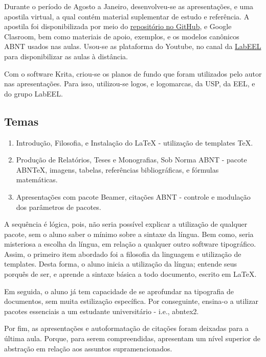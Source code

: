 \documentclass[
12pt,				%
openright,			%
oneside,			%
a4paper,			%
english,			%
french,				%
spanish,			%
brazil,				%
]{abntex2}
\begin{document}
Durante o período de Agosto a Janeiro, desenvolveu-se as apresentações, e
uma apostila virtual, a qual contém material suplementar de estudo e
referência. A apostila foi disponibilizada por meio do
\href{https://github.com/26-55-87-BuddhiLW/MC-LaTeX}{repositório no
  GitHub}, e Google Clasroom, bem como materiais de apoio,
exemplos, e os modelos canônicos ABNT usados nas aulas.  Usou-se as
plataforma do Youtube, no canal da
\href{https://www.youtube.com/channel/UC9kL6UL-iEq4nJKGs1nezQQ}{LabEEL}
para disponibilizar as aulas à distância.

Com o software Krita, criou-se os planos de fundo que foram utilizados
pelo autor nas apresentações. Para isso, utilizou-se logos, e
logomarcas, da USP, da EEL, e do grupo LabEEL.


\subsection{Temas}

\begin{enumerate}
\item Introdução, Filosofia, e Instalação do LaTeX - utilização de templates TeX.
\item Produção de Relatórios, Teses e Monografias, Sob Norma ABNT -
  pacote ABNTeX, imagens, tabelas, referências bibliográficas, e
  fórmulas matemáticas.
\item  Apresentações com pacote Beamer, citações ABNT - controle e modulação dos parâmetros de pacotes.
\end{enumerate}


A sequência é lógica, pois, não seria possível explicar a utilização de qualquer
pacote, sem o aluno saber o mínimo sobre a sintaxe da língua. Bem como, seria
misteriosa a escolha da língua, em relação a qualquer outro software tipográfico. Assim,
o primeiro item abordado foi a filosofia da linguagem e utilização de templates.
Desta forma, o aluno inicia a utilização da língua; entende seus porquês de ser,
e aprende a sintaxe básica a todo documento, escrito em \LaTeX.

Em seguida, o aluno já tem capacidade de se aprofundar na tipografia de documentos, sem muita
estilização específica. Por conseguinte, ensina-o a utilizar pacotes
essenciais a um estudante universitário - i.e., abntex2.

Por fim, as apresentações e autoformatação de citações foram
deixadas para a última aula. Porque, para serem compreendidas,
apresentam um nível superior de abstração em relação aos assuntos
supramencionados.
\end{document}
